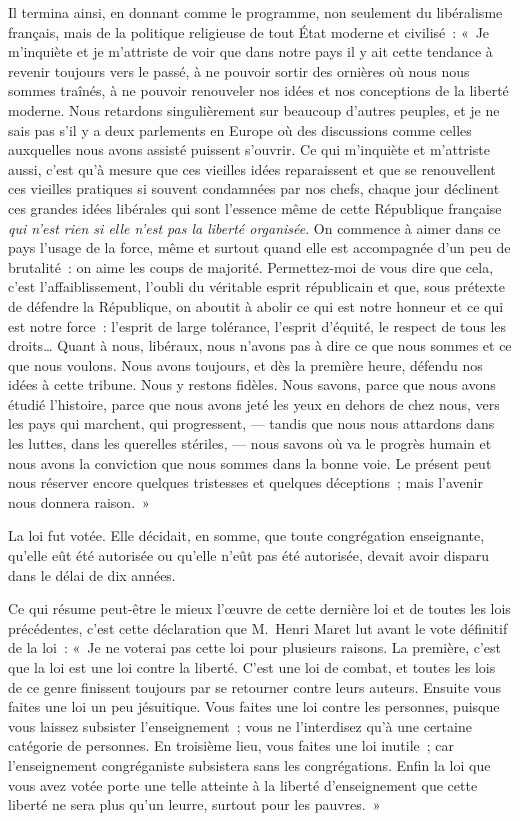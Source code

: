 \documentclass[french,twoside]{book} %
\begin{document}
Il termina ainsi, en donnant comme le programme, non seulement du libéralisme français, mais de la  politique religieuse de tout État moderne et civilisé : « Je m’inquiète et je m’attriste de voir que dans notre pays il y ait cette tendance à revenir toujours vers le passé, à ne pouvoir sortir des ornières où nous nous sommes traînés, à ne pouvoir renouveler nos idées et nos conceptions de la liberté moderne. Nous retardons singulièrement sur beaucoup d’autres peuples, et je ne sais pas s’il y a deux parlements en Europe où des discussions comme celles auxquelles nous avons assisté puissent s’ouvrir. Ce qui m’inquiète et m’attriste aussi, c’est qu’à mesure que ces vieilles idées reparaissent et que se renouvellent ces vieilles pratiques si souvent condamnées par nos chefs, chaque jour déclinent ces grandes idées libérales qui sont l’essence même de cette République française {\itshape qui n’est rien si elle n’est pas la liberté organisée}. On commence à aimer dans ce pays l’usage de la force, même et surtout quand elle est accompagnée d’un peu de brutalité : on aime les coups de majorité. Permettez-moi de vous dire que cela, c’est l’affaiblissement, l’oubli du véritable esprit républicain et que, sous prétexte de défendre la République, on aboutit à abolir ce qui est notre honneur et ce qui est notre force : l’esprit de large tolérance, l’esprit d’équité, le respect de tous les droits… Quant à nous, libéraux, nous n’avons pas à dire ce que nous  sommes et ce que nous voulons. Nous avons toujours, et dès la première heure, défendu nos idées à cette tribune. Nous y restons fidèles. Nous savons, parce que nous avons étudié l’histoire, parce que nous avons jeté les yeux en dehors de chez nous, vers les pays qui marchent, qui progressent, — tandis que nous nous attardons dans les luttes, dans les querelles stériles, — nous savons où va le progrès humain et nous avons la conviction que nous sommes dans la bonne voie. Le présent peut nous réserver encore quelques tristesses et quelques déceptions ; mais l’avenir nous donnera raison. »\par
La loi fut votée. Elle décidait, en somme, que toute congrégation enseignante, qu’elle eût été autorisée ou qu’elle n’eût pas été autorisée, devait avoir disparu dans le délai de dix années.\par
Ce qui résume peut-être le mieux l’œuvre de cette dernière loi et de toutes les lois précédentes, c’est cette déclaration que M. Henri Maret lut avant le vote définitif de la loi : « Je ne voterai pas cette loi pour plusieurs raisons. La première, c’est que la loi est une loi contre la liberté. C’est une loi de combat, et toutes les lois de ce genre finissent toujours par se retourner contre leurs auteurs. Ensuite vous faites une loi un peu jésuitique. Vous faites une loi contre les personnes, puisque vous laissez  subsister l’enseignement ; vous ne l’interdisez qu’à une certaine catégorie de personnes. En troisième lieu, vous faites une loi inutile ; car l’enseignement congréganiste subsistera sans les congrégations. Enfin la loi que vous avez votée porte une telle atteinte à la liberté d’enseignement que cette liberté ne sera plus qu’un leurre, surtout pour les pauvres. »\par
\end{document}
